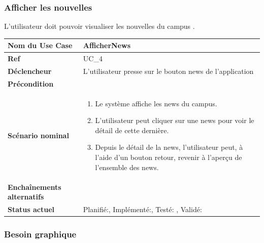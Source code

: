 	\subsubsection{Afficher les nouvelles}
					L'utilisateur doit pouvoir visualiser les nouvelles du campus .\\[0.2cm]
					\begin{longtable}{|l|p{10cm}|}
						\hline \textbf{Nom du Use Case} & AfficherNews \\ 
						\hline \textbf{Ref} & UC\_4  \\ 
						\hline \textbf{Déclencheur} & L'utilisateur presse sur le bouton news de l'application \\
						\hline \textbf{Précondition} &  \\
						\hline \textbf{Scénario nominal} & 
						\begin{enumerate}
							\item Le système affiche les news du campus.
							\item L'utilisateur peut cliquer sur une news pour voir le détail de cette dernière.
							\item Depuis le détail de la news, l'utilisateur peut, à l'aide d'un bouton retour, revenir à l'aperçu de l'ensemble des news.
						\end{enumerate}
						\\ 
						\hline \textbf{Enchaînements alternatifs} & \\
						\hline \textbf{Status actuel} & Planifié:\CheckedBox , Implémenté:\CheckedBox  , Testé: \CheckedBox  , Validé: \CheckedBox  \\
						\hline 
					\end{longtable} 
			\subsubsection*{Besoin graphique}



